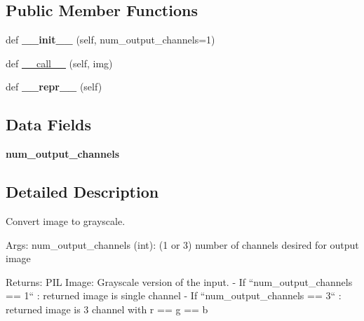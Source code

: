 \subsection*{Public Member Functions}
\begin{DoxyCompactItemize}
\item 
\mbox{\label{classtorchvision_1_1transforms_1_1transforms_1_1Grayscale_a12be5412201b52c848ea797ad0d77745}} 
def {\bfseries \+\_\+\+\_\+init\+\_\+\+\_\+} (self, num\+\_\+output\+\_\+channels=1)
\item 
def \hyperlink{classtorchvision_1_1transforms_1_1transforms_1_1Grayscale_ab719550f9f0d8446966b4744cb7c8ec3}{\+\_\+\+\_\+call\+\_\+\+\_\+} (self, img)
\item 
\mbox{\label{classtorchvision_1_1transforms_1_1transforms_1_1Grayscale_a605da60027c65cda553683a101073744}} 
def {\bfseries \+\_\+\+\_\+repr\+\_\+\+\_\+} (self)
\end{DoxyCompactItemize}
\subsection*{Data Fields}
\begin{DoxyCompactItemize}
\item 
\mbox{\label{classtorchvision_1_1transforms_1_1transforms_1_1Grayscale_a253918154931b0b02f491495a8d3800a}} 
{\bfseries num\+\_\+output\+\_\+channels}
\end{DoxyCompactItemize}


\subsection{Detailed Description}
\begin{DoxyVerb}Convert image to grayscale.

Args:
    num_output_channels (int): (1 or 3) number of channels desired for output image

Returns:
    PIL Image: Grayscale version of the input.
     - If ``num_output_channels == 1`` : returned image is single channel
     - If ``num_output_channels == 3`` : returned image is 3 channel with r == g == b\end{DoxyVerb}
 

